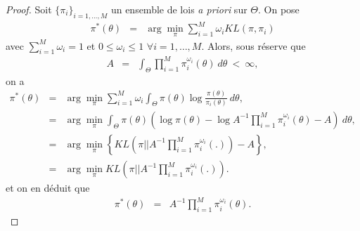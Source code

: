 \begin{proof}%
Soit $\{\pi_i\}_{i=1,\ldots,M}$ un ensemble de lois {\it a priori} sur $\Theta$. On pose
\begin{eqnarray*}
\pi^*(\theta) & = & \arg\min\limits_{\pi} \sum\limits_{i=1}^M \omega_i KL(\pi, \pi_i)
\end{eqnarray*}
avec $\sum_{i=1}^M \omega_i=1$ et $0\leq \omega_i \leq 1$ $\forall i=1,\ldots,M$. Alors, sous réserve que 
\begin{eqnarray*}
A & = & \int_{\Theta} \prod\limits_{i=1}^M \pi^{\omega_i}_i(\theta) \ d\theta \ < \ \infty,
\end{eqnarray*}
on a 
\begin{eqnarray*}
\pi^*(\theta) & = &  \arg\min\limits_{\pi} \sum\limits_{i=1}^M \omega_i \int_{\Theta} \pi(\theta) \log\frac{\pi(\theta)}{\pi_i(\theta)} \ d\theta, \\
& = &  \arg\min\limits_{\pi} \int_{\Theta} \pi(\theta) \left( \log \pi(\theta) - \log A^{-1}\prod\limits_{i=1}^M \pi^{\omega_i}_i(\theta) - A\right) \ d\theta, \\
 & = &  \arg\min\limits_{\pi} \left\{ KL\left(\pi || A^{-1}\prod\limits_{i=1}^M \pi^{\omega_i}_i(.)\right) - A\right\}, \\
 & = &  \arg\min\limits_{\pi}  KL\left(\pi || A^{-1}\prod\limits_{i=1}^M \pi^{\omega_i}_i(.)\right).
\end{eqnarray*}
et on en déduit que
\begin{eqnarray*}
\pi^*(\theta) & = & A^{-1}\prod\limits_{i=1}^M \pi^{\omega_i}_i(\theta). 
\end{eqnarray*}
\end{proof}
